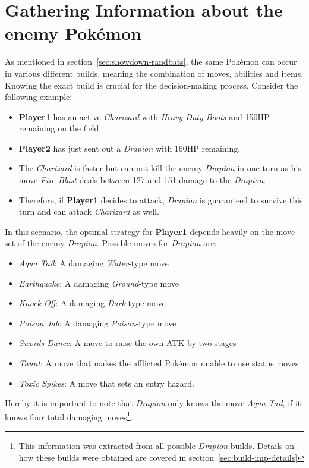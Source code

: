 \section{Gathering Information about the enemy Pokémon}
\label{sec:builds-randbats}
As mentioned in section~\ref{sec:showdown-randbats}, the same Pokémon can occur in various different builds, meaning the combination
of moves, abilities and items. Knowing the exact build is crucial for the decision-making process. Consider the following
example: 
\begin{itemize}
	\item \textbf{Player1} has an active \textit{Charizard} with \textit{Heavy-Duty Boots} and 150\ac{HP} remaining on the field.
	\item \textbf{Player2} has just sent out a \textit{Drapion} with 160\ac{HP} remaining.
	\item The \textit{Charizard} is faster but can not kill the enemy \textit{Drapion} in one turn as his move 
	\textit{Fire Blast} deals between 127 and 151 damage to the \textit{Drapion}. 
	\item Therefore, if \textbf{Player1} decides to attack, \textit{Drapion} is guaranteed to survive this turn
	and can attack \textit{Charizard} as well.
\end{itemize}
In this scenario, the optimal strategy for \textbf{Player1} depends heavily on the move set of the enemy \textit{Drapion}.
Possible moves for \textit{Drapion} are:
\begin{itemize}
	\item \textit{Aqua Tail}: A damaging \textit{Water}-type move
	\item \textit{Earthquake}: A damaging \textit{Ground}-type move
	\item \textit{Knock Off}: A damaging \textit{Dark}-type move
	\item \textit{Poison Jab}: A damaging \textit{Poison}-type move
	\item \textit{Swords Dance}: A move to raise the own \ac{ATK} by two stages
	\item \textit{Taunt}: A move that makes the afflicted Pokémon unable to use status moves
	\item \textit{Toxic Spikes}: A move that sets an entry hazard.
\end{itemize}
Hereby it is important to note that \textit{Drapion} only knows the move \textit{Aqua Tail}, if it knows four total 
damaging moves\footnote{This information was extracted from all possible \textit{Drapion} builds. Details on 
how these builds were obtained are covered in section~\ref{sec:build-imp-details}}. 
